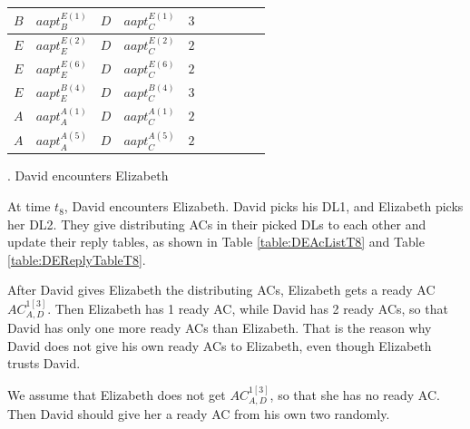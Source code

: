 \begin{table} [H]
\begin{tabu}{|c|c|c|c|c|c|c|c|c|c|}
$B$ & ${aapt}_{B}^{E\left(1\right)}$ & $D$ & ${aapt}_{C}^{E\left(1\right)}$ & $3$ &  &  &  &  &  \\ \hline
$E$ & ${aapt}_{E}^{E\left(2\right)}$ & $D$ & ${aapt}_{C}^{E\left(2\right)}$ & $2$ &  &  &  &  &  \\ \hline
$E$ & ${aapt}_{E}^{E\left(6\right)}$ & $D$ & ${aapt}_{C}^{E\left(6\right)}$ & $2$ &  &  &  &  &  \\ \hline
$E$ & ${aapt}_{E}^{B\left(4\right)}$ & $D$ & ${aapt}_{C}^{B\left(4\right)}$ & $3$ &  &  &  &  &  \\ \hline
$A$ & ${aapt}_{A}^{A\left(1\right)}$ & $D$ & ${aapt}_{C}^{A\left(1\right)}$ & $2$ &  &  &  &  &  \\ \hline
$A$ & ${aapt}_{A}^{A\left(5\right)}$ & $D$ & ${aapt}_{C}^{A\left(5\right)}$ & $2$ &  &  &  &  &  \\ \hline
\end{tabu}
\end{table}


.  David encounters Elizabeth

At time ${t}_{8}$, David encounters Elizabeth. David picks his DL1, and Elizabeth picks her DL2. They give distributing ACs in their picked DLs to each other and update their reply tables, as shown in Table \ref{table:DEAcListT8} and Table \ref{table:DEReplyTableT8}.

After David gives Elizabeth the distributing ACs, Elizabeth gets a ready AC ${AC}^{1\left[3\right]}_{A,D}$. Then Elizabeth has 1 ready AC, while David has 2 ready ACs, so that David has only one more ready ACs than Elizabeth. That is the reason why David does not give his own ready ACs to Elizabeth, even though Elizabeth trusts David. 

We assume that Elizabeth does not get ${AC}^{1\left[3\right]}_{A,D}$, so that she has no ready AC. Then David should give her a ready AC from his own two randomly.

